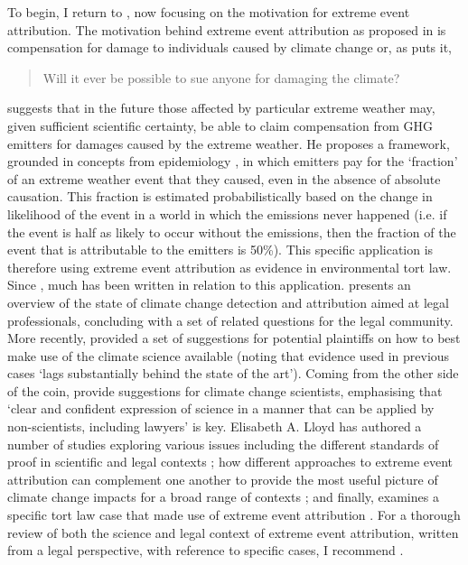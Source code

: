  To begin, I return to  \citep{allen_liability_2003}, now focusing on the motivation for extreme event attribution. The motivation behind extreme event attribution as proposed in  is compensation for damage to individuals caused by climate change or, as \citeauthor{allen_liability_2003} puts it, 
  \begin{quote}
    Will it ever be possible to sue anyone for damaging the climate?
  \end{quote}
  \citeauthor{allen_liability_2003} suggests that in the future those affected by particular extreme weather may, given sufficient scientific certainty, be able to claim compensation from GHG emitters for damages caused by the extreme weather. He proposes a framework, grounded in concepts from epidemiology \citep{stone_end--end_2005}, in which emitters pay for the `fraction' of an extreme weather event that they caused, even in the absence of absolute causation. This fraction is estimated probabilistically based on the change in likelihood of the event in a world in which the emissions never happened (i.e. if the event is half as likely to occur without the emissions, then the fraction of the event that is attributable to the emitters is 50\%).
  This specific application is therefore using extreme event attribution as evidence in environmental tort law. Since \citet{allen_liability_2003}, much has been written in relation to this application. \citet{allen_scientific_2007} presents an overview of the state of climate change detection and attribution aimed at legal professionals, concluding with a set of related questions for the legal community. More recently, \citet{stuart-smith_filling_2021} provided a set of suggestions for potential plaintiffs on how to best make use of the climate science available (noting that evidence used in previous cases `lags substantially behind the state of the art'). Coming from the other side of the coin, \citet{marjanac_acts_2017} provide suggestions for climate change scientists, emphasising that `clear and confident expression of science in a manner that can be applied by non-scientists, including lawyers' is key. Elisabeth A. Lloyd has authored a number of studies exploring various issues including the different standards of proof in scientific and legal contexts \citep{lloyd_climate_2021}; how different approaches to extreme event attribution can complement one another to provide the most useful picture of climate change impacts for a broad range of contexts \citep{lloyd_climate_2018,lloyd_environmental_2020}; and finally, examines a specific tort law case that made use of extreme event attribution \citep{lloyd_climate_2021-1}. For a thorough review of both the science and legal context of extreme event attribution, written from a legal perspective, with reference to specific cases, I recommend \citet{burger_law_2020,marjanac_extreme_2018}.
  
